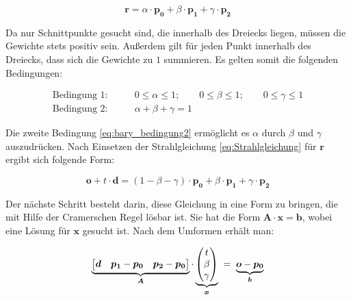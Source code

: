 \begin{equation}
\label{eq:bary}
    \boldsymbol{r} = \alpha \cdot \boldsymbol{p_0} + \beta \cdot \boldsymbol{p_1} + \gamma \cdot \boldsymbol{p_2}
\end{equation}

Da nur Schnittpunkte gesucht sind, die innerhalb des Dreiecks liegen, müssen die Gewichte stets positiv sein. Außerdem gilt für jeden Punkt innerhalb des Dreiecks, dass sich die Gewichte zu \( 1 \) summieren. Es gelten somit die folgenden Bedingungen:

\begin{align}
\label{eq:bary_bedingung1}
\text{Bedingung 1:} &      \qquad 0 \leq \alpha \leq 1;  \qquad 0 \leq \beta \leq 1; \qquad 0 \le \gamma \leq 1 \\
\label{eq:bary_bedingung2}
\text{Bedingung 2:} &      \qquad \alpha + \beta + \gamma = 1 
\end{align}


Die zweite Bedingung \ref{eq:bary_bedingung2} ermöglicht es \( \alpha \) durch \( \beta \) und \( \gamma \) auszudrücken. Nach Einsetzen der Strahlgleichung \ref{eq:Strahlgleichung} für \( \boldsymbol{r} \) ergibt sich folgende Form: 


\begin{equation*}
    \boldsymbol{o} + t \cdot \boldsymbol{d} = (1 - \beta - \gamma) \cdot \boldsymbol{p_0} + \beta \cdot \boldsymbol{p_1} + \gamma \cdot \boldsymbol{p_2}
\end{equation*}

Der nächste Schritt besteht darin, diese Gleichung in eine Form zu bringen, die mit Hilfe der Cramerschen Regel lösbar ist. Sie hat die Form \( \boldsymbol{A} \cdot \boldsymbol{x} = \boldsymbol{b} \), wobei eine Lösung für \( \boldsymbol{x} \) gesucht ist. Nach dem Umformen erhält man:

\begin{equation*}
\underbrace{%
    \begin{bmatrix}
        \boldsymbol{d} & \boldsymbol{p_1}-\boldsymbol{p_0} & \boldsymbol{p_2}-\boldsymbol{p_0}
    \end{bmatrix}%
}_{\boldsymbol{A}}
\cdot
\underbrace{%
    \begin{pmatrix} t \\ \beta \\ \gamma \end{pmatrix}%
}_{\boldsymbol{x}}
\;=\;
\underbrace{%
    \boldsymbol{o}-\boldsymbol{p_0}%
}_{\boldsymbol{b}}
\end{equation*}

